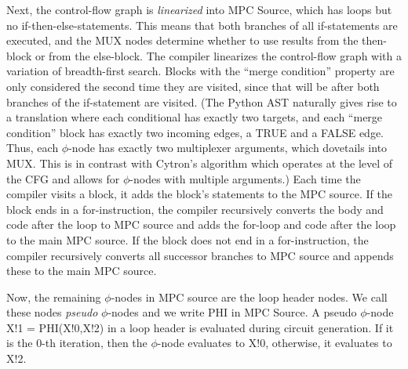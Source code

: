 Next, the control-flow graph is \emph{linearized} into MPC Source,
which has loops but no if-then-else-statements.
This means that both branches of all if-statements are executed,
and the MUX nodes determine whether to use results from the then-block or from the else-block.
The compiler linearizes the control-flow graph with a variation of breadth-first search.
Blocks with the ``merge condition'' property are only considered
the second time they are visited,
since that will be after both branches of the if-statement are visited.
(The Python AST naturally gives rise to a translation where each conditional has exactly two targets,
and each ``merge condition'' block has exactly two incoming edges, a TRUE and a FALSE edge.
Thus, each $\phi$-node has exactly two multiplexer arguments, which dovetails into MUX.
This is in contrast with Cytron's algorithm which operates at the level of the CFG and allows for
$\phi$-nodes with multiple arguments.)
Each time the compiler visits a block,
it adds the block's statements to the MPC source.
If the block ends in a for-instruction,
the compiler recursively converts the body and code after the loop to MPC source
and adds the for-loop and code after the loop to the main MPC source.
If the block does not end in a for-instruction,
the compiler recursively converts all successor branches to MPC source and
appends these to the main MPC source.

Now, the remaining $\phi$-nodes in MPC source are the loop header nodes. We call these nodes \emph{pseudo} $\phi$-nodes
and we write {\sf PHI} in MPC Source. A pseudo $\phi$-node {\sf X!1 = PHI(X!0,X!2)} in a loop header is evaluated
during circuit generation. If it is the 0-th iteration, then the $\phi$-node evaluates to {\sf X!0}, otherwise, it evaluates to {\sf X!2}.


